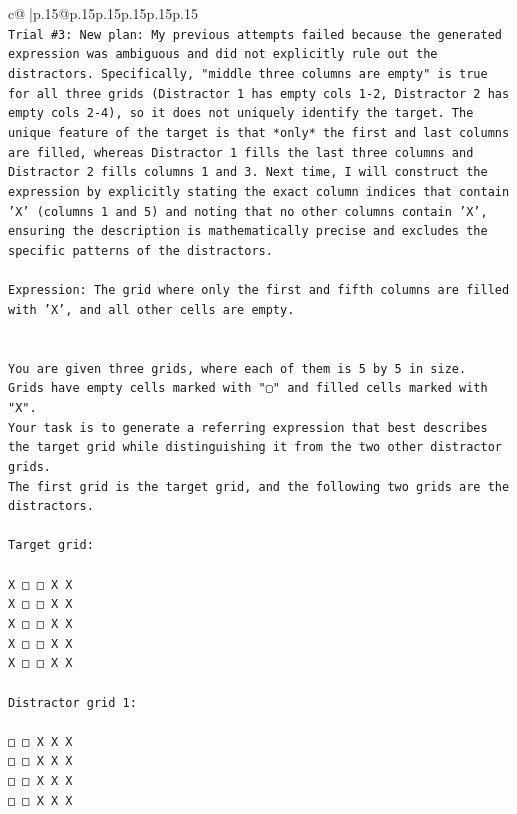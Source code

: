 \documentclass{article}
\begin{document}
{\begin{supertabular}{c@{$\;$}|p{.15\linewidth}@{}p{.15\linewidth}p{.15\linewidth}p{.15\linewidth}p{.15\linewidth}p{.15\linewidth}}
{{{\\ 
\texttt{Trial \#3: New plan: My previous attempts failed because the generated expression was ambiguous and did not explicitly rule out the distractors. Specifically, "middle three columns are empty" is true for all three grids (Distractor 1 has empty cols 1{-}2, Distractor 2 has empty cols 2{-}4), so it does not uniquely identify the target. The unique feature of the target is that *only* the first and last columns are filled, whereas Distractor 1 fills the last three columns and Distractor 2 fills columns 1 and 3. Next time, I will construct the expression by explicitly stating the exact column indices that contain 'X' (columns 1 and 5) and noting that no other columns contain 'X', ensuring the description is mathematically precise and excludes the specific patterns of the distractors.} \\
\\ 
\texttt{Expression: The grid where only the first and fifth columns are filled with 'X', and all other cells are empty.} \\
\\ 
\\ 
\texttt{You are given three grids, where each of them is 5 by 5 in size.} \\
\texttt{Grids have empty cells marked with "▢" and filled cells marked with "X".} \\
\texttt{Your task is to generate a referring expression that best describes the target grid while distinguishing it from the two other distractor grids.} \\
\texttt{The first grid is the target grid, and the following two grids are the distractors.} \\
\\ 
\texttt{Target grid:} \\
\\ 
\texttt{X □ □ X X} \\
\texttt{X □ □ X X} \\
\texttt{X □ □ X X} \\
\texttt{X □ □ X X} \\
\texttt{X □ □ X X} \\
\\ 
\texttt{Distractor grid 1:} \\
\\ 
\texttt{□ □ X X X} \\
\texttt{□ □ X X X} \\
\texttt{□ □ X X X} \\
\texttt{□ □ X X X} \\
}}}
\end{supertabular}}
\end{document}
